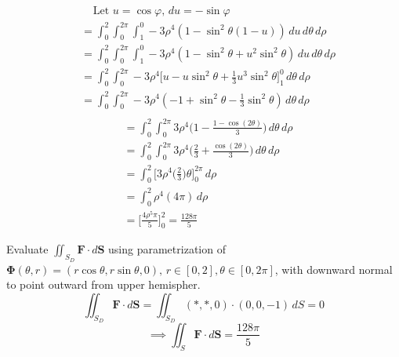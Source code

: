\documentclass{article}
\begin{document}
    \begin{multicols}{2}
    \begin{align*} 
        &\; \; \; \; \text{Let } u = \cos \varphi ,\, du = -\sin \varphi \\
        &= \int_0^{2} \int_0^{2\pi} \int_1^0 -3\rho^4 (1 - \sin^2 \theta (1 - u)) \, du \, d\theta \, d\rho \\
        &= \int_0^{2} \int_0^{2\pi} \int_1^0 -3\rho^4 (1 - \sin^2 \theta + u^2\sin^2 \theta ) \, du \, d\theta \, d\rho \\
        &= \int_0^{2} \int_0^{2\pi} -3\rho^4 \bigg[u - u\sin^2 \theta + \frac{1}{3}u^3\sin^2 \theta \bigg]_1^0 \, d\theta \, d\rho \\
        &= \int_0^{2} \int_0^{2\pi} -3\rho^4 (-1 +\sin^2 \theta - \frac{1}{3}\sin^2 \theta) \, d\theta \, d\rho \\
    \end{align*} 
    \begin{align*} 
        &= \int_0^{2} \int_0^{2\pi} 3\rho^4 \bigg(1 - \frac{1 - \cos(2\theta)}{3}\bigg) \, d\theta \, d\rho \\
        &= \int_0^{2} \int_0^{2\pi} 3\rho^4 \bigg(\frac{2}{3} + \frac{\cos(2\theta)}{3}\bigg) \, d\theta \, d\rho \\
        &= \int_0^{2} \bigg[ 3\rho^4 \bigg(\frac{2}{3} \bigg) \theta \bigg]_0^{2\pi} \, d\rho \\
        &= \int_0^{2} \rho^4(4\pi) \, d\rho \\
        &= \bigg[\frac{4\rho^5\pi}{5} \bigg]_0^{2} = \frac{128\pi}{5}
    \end{align*}  
    \end{multicols}
    Evaluate $\displaystyle \iint_{S_D} \boldsymbol F \cdot d \boldsymbol S$ using parametrization of $\boldsymbol \Phi (\theta, r) = (r\cos \theta, r\sin \theta, 0),\, r\in [0, 2], \theta \in [0,2\pi]$, with downward normal to point outward from upper hemispher. 
   \[\iint_{S_D} \boldsymbol F \cdot d \boldsymbol S = \iint_{S_D} (*,*,0) \cdot (0,0,-1) \, dS = 0\]
   \[ \implies \iint_S \boldsymbol F \cdot d \boldsymbol S = \frac{128\pi}{5} \]
\end{document}

